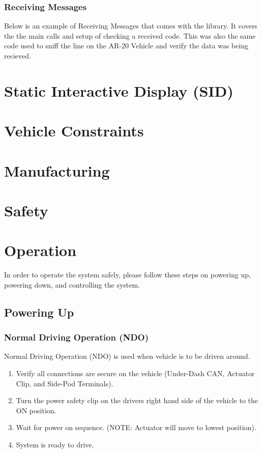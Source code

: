 \documentclass{article}
\begin{document}
\subsubsection{Receiving Messages}
Below is an example of Receiving Messages that comes with the library. It covers the the main calls and setup of checking a received code. This was also the same code used to sniff the line on the AR-20 Vehicle and verify the data was being recieved.


\section{Static Interactive Display (SID)}
\section{Vehicle Constraints}
\section{Manufacturing}
\section{Safety}

\section{Operation}
In order to operate the system safely, please follow these steps on powering up, powering down, and controlling the system.
\subsection{Powering Up}
\subsubsection{Normal Driving Operation (NDO)}
Normal Driving Operation (NDO) is used when vehicle is to be driven around.
\begin{enumerate}
    \item Verify all connections are secure on the vehicle (Under-Dash CAN, Actuator Clip, and Side-Pod Terminals).
    \item Turn the power safety clip on the drivers right hand side of the vehicle to the ON position.
    \item Wait for power on sequence. (NOTE: Actuator will move to lowest position).
    \item System is ready to drive.
\end{enumerate}
\end{document}
